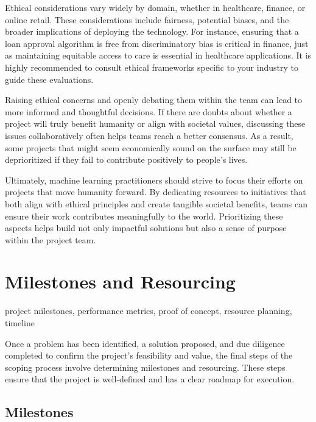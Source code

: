 \documentclass[12pt,openany, draft]{book}
\begin{document}
Ethical considerations vary widely by domain, whether in healthcare, finance, or online retail. These considerations include fairness, potential biases, and the broader implications of deploying the technology. For instance, ensuring that a loan approval algorithm is free from discriminatory bias is critical in finance, just as maintaining equitable access to care is essential in healthcare applications. It is highly recommended to consult ethical frameworks specific to your industry to guide these evaluations. \newline

Raising ethical concerns and openly debating them within the team can lead to more informed and thoughtful decisions. If there are doubts about whether a project will truly benefit humanity or align with societal values, discussing these issues collaboratively often helps teams reach a better consensus. As a result, some projects that might seem economically sound on the surface may still be deprioritized if they fail to contribute positively to people's lives. \newline

Ultimately, machine learning practitioners should strive to focus their efforts on projects that move humanity forward. By dedicating resources to initiatives that both align with ethical principles and create tangible societal benefits, teams can ensure their work contributes meaningfully to the world. Prioritizing these aspects helps build not only impactful solutions but also a sense of purpose within the project team. \newline


\section{Milestones and Resourcing}

\begin{keywordsbox}
project milestones, performance metrics, proof of concept, resource planning, timeline
\end{keywordsbox}


Once a problem has been identified, a solution proposed, and due diligence completed to confirm the project's feasibility and value, the final steps of the scoping process involve determining milestones and resourcing. These steps ensure that the project is well-defined and has a clear roadmap for execution.

\subsection{Milestones}
\end{document}

